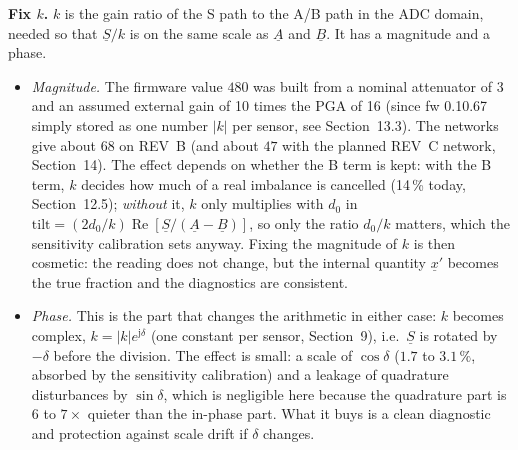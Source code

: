 \documentclass[11pt,a4paper]{article}
\begin{document}
\textbf{Fix $k$.}  $k$ is the gain ratio of the S path to the A/B path in the ADC
domain, needed so that $\underline{S}/k$ is on the same scale as $\underline{A}$ and
$\underline{B}$.  It has a magnitude and a phase.
\begin{itemize}
  \item \emph{Magnitude.}  The firmware value $480$ was built from a nominal
        attenuator of 3 and an assumed external gain of 10 times the PGA of 16 (since
        fw 0.10.67 simply stored as one number $|k|$ per sensor, see Section~13.3).  The
        networks give about $68$ on REV~B (and about $47$ with the planned REV~C
        network, Section~14).  The effect depends on whether the B term is kept:
        with the B term, $k$ decides how much of a real imbalance is cancelled
        (14\,\% today, Section~12.5); \emph{without} it, $k$ only multiplies
        with $d_0$ in $\text{tilt}=(2d_0/k)\operatorname{Re}[\underline{S}/(\underline{A}-\underline{B})]$,
        so only the ratio $d_0/k$ matters, which the sensitivity calibration sets anyway.
        Fixing the magnitude of $k$ is then cosmetic: the reading does not change, but
        the internal quantity $\underline{x}'$ becomes the true fraction and the
        diagnostics are consistent.
  \item \emph{Phase.}  This is the part that changes the arithmetic in either case:
        $k$ becomes complex, $k=|k|e^{\mathrm{j}\delta}$ (one constant per sensor,
        Section~9), i.e.\ $\underline{S}$ is rotated by $-\delta$ before the division.  The
        effect is small: a scale of $\cos\delta$ ($1.7$ to $3.1\,\%$, absorbed by the
        sensitivity calibration) and a leakage of quadrature disturbances by $\sin\delta$,
        which is negligible here because the quadrature part is $6$ to $7\times$ quieter
        than the in-phase part.  What it buys is a clean diagnostic and protection
        against scale drift if $\delta$ changes.
\end{itemize}
\end{document}
